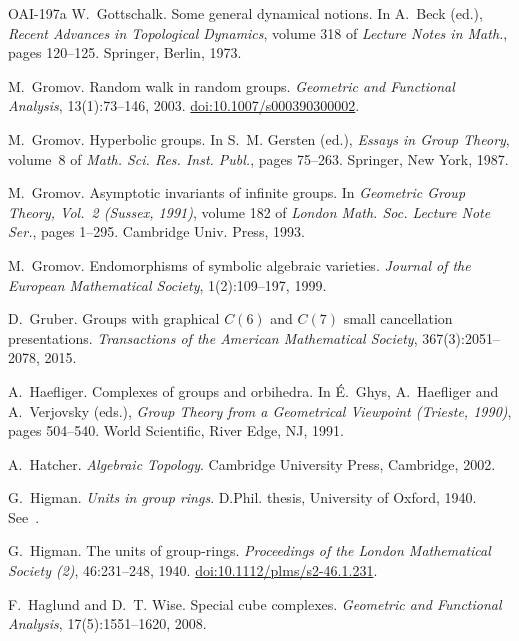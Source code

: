 \documentclass[11pt]{article}
\theoremstyle{definition}
\theoremstyle{plain}
\newcommand{\doi}[1]{\href{https://doi.org/#1}{doi:#1}}
\begin{document}
\begin{thebibliography}{OAI-197a}
W.~Gottschalk.
\newblock Some general dynamical notions.
\newblock In A.~Beck (ed.), \emph{Recent Advances in Topological Dynamics}, volume 318 of \emph{Lecture Notes in Math.}, pages 120--125. Springer, Berlin, 1973.

M.~Gromov.
\newblock Random walk in random groups.
\newblock \emph{Geometric and Functional Analysis}, 13(1):73--146, 2003. \doi{10.1007/s000390300002}.

M.~Gromov.
\newblock Hyperbolic groups.
\newblock In S.~M. Gersten (ed.), \emph{Essays in Group Theory}, volume~8 of \emph{Math. Sci. Res. Inst. Publ.}, pages 75--263. Springer, New York, 1987.

M.~Gromov.
\newblock Asymptotic invariants of infinite groups.
\newblock In \emph{Geometric Group Theory, Vol.~2 (Sussex, 1991)}, volume 182 of \emph{London Math. Soc. Lecture Note Ser.}, pages 1--295. Cambridge Univ. Press, 1993.

M.~Gromov.
\newblock Endomorphisms of symbolic algebraic varieties.
\newblock \emph{Journal of the European Mathematical Society}, 1(2):109--197, 1999.

D.~Gruber.
\newblock Groups with graphical $C(6)$ and $C(7)$ small cancellation presentations.
\newblock \emph{Transactions of the American Mathematical Society}, 367(3):2051--2078, 2015.

A.~Haefliger.
\newblock Complexes of groups and orbihedra.
\newblock In \'E.~Ghys, A.~Haefliger and A.~Verjovsky (eds.), \emph{Group Theory from a Geometrical Viewpoint (Trieste, 1990)}, pages 504--540. World Scientific, River Edge, NJ, 1991.

A.~Hatcher.
\newblock \emph{Algebraic Topology}.
\newblock Cambridge University Press, Cambridge, 2002.

G.~Higman.
\newblock \emph{Units in group rings}.
\newblock D.Phil. thesis, University of Oxford, 1940. See~\cite{Sandling1981}.

G.~Higman.
\newblock The units of group-rings.
\newblock \emph{Proceedings of the London Mathematical Society (2)}, 46:231--248, 1940. \doi{10.1112/plms/s2-46.1.231}.

F.~Haglund and D.~T. Wise.
\newblock Special cube complexes.
\newblock \emph{Geometric and Functional Analysis}, 17(5):1551--1620, 2008.


\end{thebibliography}
\end{document}

